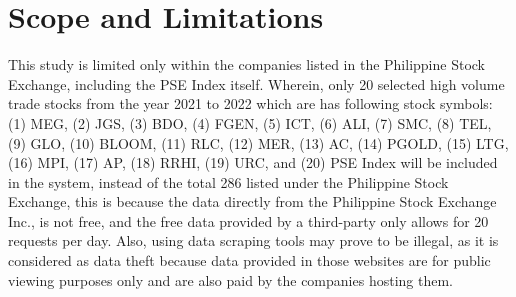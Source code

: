 \section{Scope and Limitations}
\label{sec:scope}
This study is limited only within the companies listed in the 
Philippine Stock Exchange, including the PSE Index itself. 
Wherein, only 20 selected high volume trade stocks from the year 2021 to 2022 
which are has following stock symbols: (1) MEG, (2) JGS, (3) BDO, (4) FGEN, 
(5) ICT, (6) ALI, (7) SMC, (8) TEL, (9) GLO, (10) BLOOM, (11) RLC, (12) MER, 
(13) AC, (14) PGOLD, (15) LTG, (16) MPI, (17) AP, (18) RRHI, (19) URC, and 
(20) PSE Index will be included in the system, instead of the total 286 listed
under the Philippine Stock Exchange, this is because the data directly 
from the Philippine Stock Exchange Inc., is not free, and the free data 
provided by a third-party only allows for 20 requests per day. Also, using 
data scraping tools may prove to be illegal, as it is considered as data theft
because data provided in those websites are for public viewing purposes only 
and are also paid by the companies hosting them.